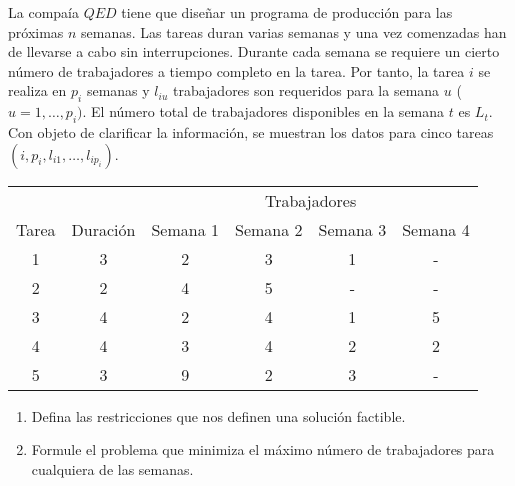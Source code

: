 \documentclass[twoside]{article}
\begin{document}
\begin{ejercicio}{12}
La compaía $QED$ tiene que diseñar un programa de producción para las próximas $n$ semanas. Las tareas duran varias semanas y una vez comenzadas han de llevarse a cabo sin interrupciones. Durante cada semana se requiere un cierto número de trabajadores a tiempo completo en la tarea. Por tanto, la tarea $i$ se realiza en $p_i$ semanas y $l_{iu}$ trabajadores son requeridos para la semana $u$ ($u=1,\dots,p_i)$. El número total de trabajadores disponibles en la semana $t$ es $L_t$. Con objeto de clarificar la información, se muestran los datos para cinco tareas $(i,p_i,l_{i1},\dots,l_{ip_{i}})$.
\begin{center}
\begin{tabular}{c|c|cccc}
\hline
& & & \multicolumn{2}{c}{Trabajadores}  &\\
Tarea & Duración & Semana 1 & Semana 2 & Semana 3 & Semana 4\\
\hline
\hline
1 & 3 & 2 & 3 & 1 & -\\
2 & 2 & 4 & 5 & - & -\\
3 & 4 & 2 & 4& 1 & 5\\
4 &4 & 3 & 4 & 2 & 2\\
5 & 3& 9 & 2 & 3 & -\\
\hline
\end{tabular}
\end{center}
\begin{enumerate}
\item Defina las restricciones que nos definen una solución factible.
\item Formule el problema que minimiza el máximo número de trabajadores para cualquiera de las semanas.
\end{enumerate}
\end{ejercicio}
\end{document}
